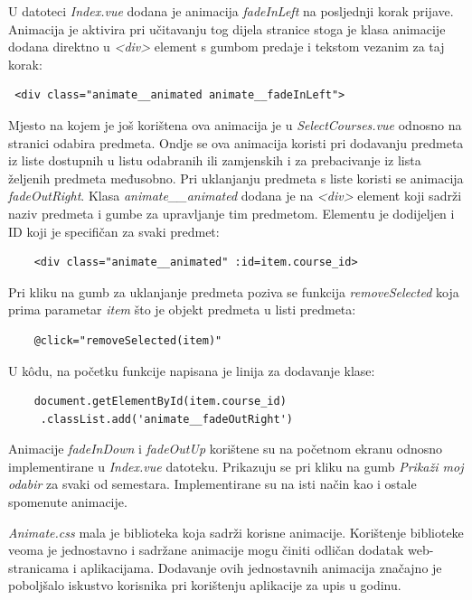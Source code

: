 \documentclass[times, utf8, zavrsni, numeric]{fer}
\begin{document}
    U datoteci \textit{Index.vue} dodana je animacija \textit{fadeInLeft} na posljednji korak prijave. Animacija je aktivira pri učitavanju tog dijela stranice stoga je klasa animacije dodana direktno u \textit{<div>} element s gumbom predaje i tekstom vezanim za taj korak:
    \begin{verbatim} <div class="animate__animated animate__fadeInLeft"> \end{verbatim}
    Mjesto na kojem je još korištena ova animacija je u \textit{SelectCourses.vue} odnosno na stranici odabira predmeta. Ondje se ova animacija koristi pri dodavanju predmeta iz liste dostupnih u listu odabranih ili zamjenskih i za prebacivanje iz lista željenih predmeta međusobno. Pri uklanjanju predmeta s liste koristi se animacija \textit{fadeOutRight}. Klasa \textit{animate\_\_animated} dodana je na \textit{<div>} element koji sadrži naziv predmeta i gumbe za upravljanje tim predmetom. Elementu je dodijeljen i ID koji je specifičan za svaki predmet:
    \begin{verbatim}
    <div class="animate__animated" :id=item.course_id>
    \end{verbatim}
    Pri kliku na gumb za uklanjanje predmeta poziva se funkcija \textit{removeSelected} koja prima parametar \textit{item} što je objekt predmeta u listi predmeta:
    \begin{verbatim}
    @click="removeSelected(item)"
    \end{verbatim}
    U kôdu, na početku funkcije napisana je linija za dodavanje klase: \begin{verbatim}
    document.getElementById(item.course_id)
     .classList.add('animate__fadeOutRight')
    \end{verbatim}
    
    Animacije \textit{fadeInDown} i \textit{fadeOutUp} korištene su na početnom ekranu odnosno implementirane u \textit{Index.vue} datoteku. Prikazuju se pri kliku na gumb \textit{Prikaži moj odabir} za svaki od semestara. Implementirane su na isti način kao i ostale spomenute animacije.
    
    \textit{Animate.css} mala je biblioteka koja sadrži korisne animacije. Korištenje biblioteke veoma je jednostavno i sadržane animacije mogu činiti odličan dodatak web-stranicama i aplikacijama. Dodavanje ovih jednostavnih animacija značajno je poboljšalo iskustvo korisnika pri korištenju aplikacije za upis u godinu.
    
\end{document}
